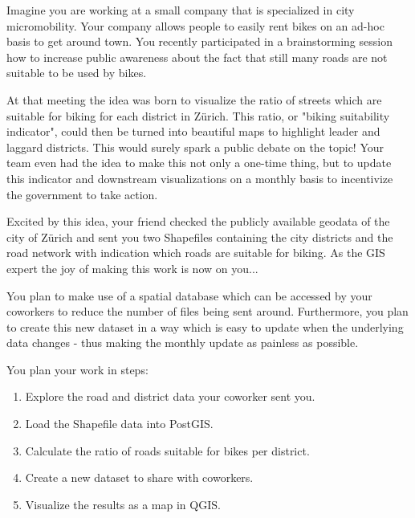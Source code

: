 \documentclass[11pt, a4paper, oneside, parskip=full-]{scrartcl}
\begin{document}
Imagine you are working at a small company that is specialized in city
micromobility. Your company allows people to easily rent bikes on an ad-hoc
basis to get around town. You recently participated in a brainstorming session
how to increase public awareness about the fact that still many roads are not
suitable to be used by bikes.

At that meeting the idea was born to visualize the ratio of streets which are
suitable for biking for each district in Zürich. This ratio, or "biking
suitability indicator", could then be turned into beautiful maps to highlight
leader and laggard districts. This would surely spark a public debate on the
topic! Your team even had the idea to make this not only a one-time thing, but
to update this indicator and downstream visualizations on a monthly basis to
incentivize the government to take action.

Excited by this idea, your friend checked the publicly available geodata of the
city of Zürich and sent you two Shapefiles containing the city districts and the
road network with indication which roads are suitable for biking. As the GIS
expert the joy of making this work is now on you...

You plan to make use of a spatial database which can be accessed by your
coworkers to reduce the number of files being sent around. Furthermore, you plan
to create this new dataset in a way which is easy to update when the underlying
data changes - thus making the monthly update as painless as possible.

You plan your work in steps:
\begin{enumerate}
  \item Explore the road and district data your coworker sent you.
  \item Load the Shapefile data into PostGIS.
  \item Calculate the ratio of roads suitable for bikes per district.
  \item Create a new dataset to share with coworkers.
  \item Visualize the results as a map in QGIS.
\end{enumerate}

\end{document}
